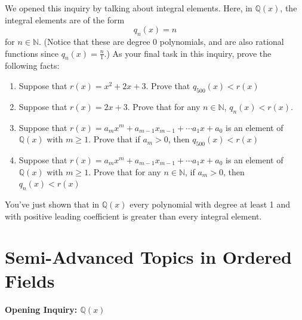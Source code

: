 \documentclass[11pt]{article}
\newenvironment{task}
	{\begin{mdframed}[linecolor=lightgray, linewidth=3pt]\raggedright}
	{\end{mdframed}}
\theoremstyle{definition}
\begin{document}
\begin{task}
We opened this inquiry by talking about integral elements. Here, in $\mathbb{Q}(x)$, the integral elements are of the form
\[ q_n(x) = n \]
for $n\in\mathbb{N}$. (Notice that these are degree 0 polynomials, and are also rational functions since $q_n(x) = \frac{n}{1}$.) As your final task in
this inquiry, prove the following facts:

\begin{enumerate}
  \item Suppose that $r(x) =  x^2 + 2x + 3$. Prove that $q_{500}(x) < r(x)$
  \item Suppose that $r(x) =  2x + 3$. Prove that for any $n\in\mathbb{N}$, $q_n(x) < r(x)$.
  \item Suppose that $r(x) =  a_mx^m + a_{m-1}x_{m-1}+\cdots a_1x + a_0$ is an element
    of $\mathbb{Q}(x)$ with $m \geq 1$. Prove that if $a_m > 0$, then $q_{500}(x) < r(x)$
  \item Suppose that $r(x) =  a_mx^m + a_{m-1}x_{m-1}+\cdots a_1x + a_0$ is an element
    of $\mathbb{Q}(x)$ with $m \geq 1$. Prove that for any $n\in\mathbb{N}$, if $a_m > 0$, then $q_{n}(x) < r(x)$
\end{enumerate}

You've just shown that in $\mathbb{Q}(x)$ every polynomial with degree at least 1 and with positive leading coefficient is greater than every integral
element. 
\end{task}

\part{Semi-Advanced Topics in Ordered Fields}

\subsection{Opening Inquiry: $\mathbb{Q}(x)$}
\end{document}
